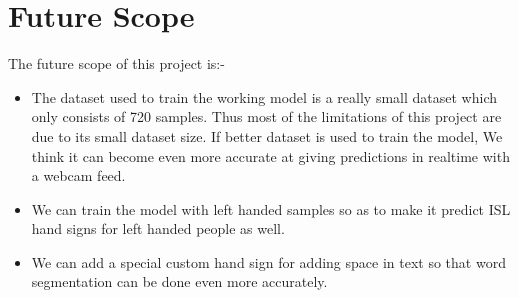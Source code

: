 \documentclass[12pt,a4paper]{report}
\begin{document}
\section{Future Scope}
The future scope of this project is:-
\begin{itemize}
	\item The dataset used to train the working model is a really small dataset which only consists of 720 samples. Thus most of the limitations of this project are due to its small dataset size. If better dataset is used to train the model, We think it can become even more accurate at giving predictions in realtime with a webcam feed.
	\item We can train the model with left handed samples so as to make it predict ISL hand signs for left handed people as well.
	\item We can add a special custom hand sign for adding space in text so that word segmentation can be done even more accurately.
\end{itemize}
\end{document}
